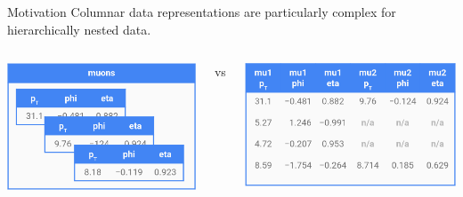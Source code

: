 \documentclass[aspectratio=169]{beamer}
\begin{document}
\begin{frame}[fragile]{Motivation}
\vspace{0.2 cm}
Columnar data representations are particularly complex for hierarchically nested data.

\vspace{0.25 cm}
\begin{columns}
\includegraphics[width=\linewidth]{muons-as-objects.png}

\centering vs

\includegraphics[width=\linewidth]{muons-as-a-table.png}
\end{columns}


\end{frame}
\end{document}
